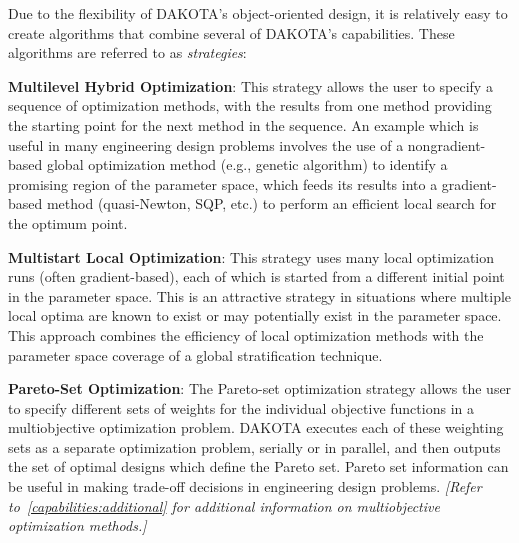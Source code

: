 Due to the flexibility of DAKOTA's object-oriented design, it is
relatively easy to create algorithms that combine several of DAKOTA's
capabilities. These algorithms are referred to as \emph{strategies}:

\textbf{Multilevel Hybrid Optimization}: This strategy allows the user to
specify a sequence of optimization methods, with the results from one
method providing the starting point for the next method in the
sequence. An example which is useful in many engineering design
problems involves the use of a nongradient-based global optimization
method (e.g., genetic algorithm) to identify a promising region of the
parameter space, which feeds its results into a gradient-based method
(quasi-Newton, SQP, etc.) to perform an efficient local search for the
optimum point.

\textbf{Multistart Local Optimization}: This strategy uses many local
optimization runs (often gradient-based), each of which is started
from a different initial point in the parameter space. This is an
attractive strategy in situations where multiple local optima are
known to exist or may potentially exist in the parameter space. This
approach combines the efficiency of local optimization methods with
the parameter space coverage of a global stratification technique.

\textbf{Pareto-Set Optimization}: The Pareto-set optimization strategy
allows the user to specify different sets of weights for the
individual objective functions in a multiobjective optimization
problem. DAKOTA executes each of these weighting sets as a separate
optimization problem, serially or in parallel, and then outputs the
set of optimal designs which define the Pareto set. Pareto set
information can be useful in making trade-off decisions in engineering
design problems.  \emph{[Refer to~\ref{capabilities:additional} for
additional information on multiobjective optimization methods.]}


